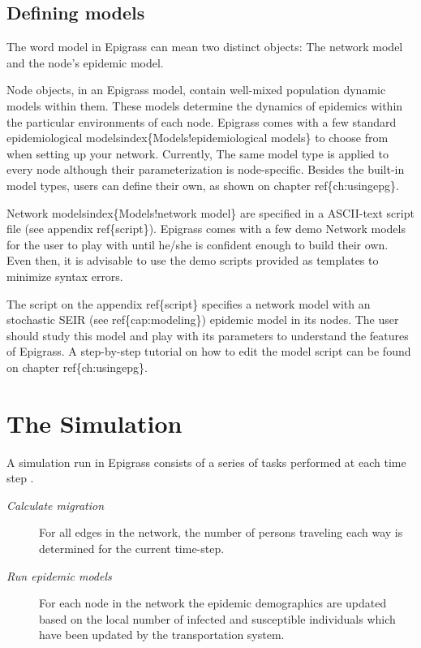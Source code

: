 \documentclass[a4paper,10pt]{manual}
\begin{document}
\subsection{Defining models}

The word model in Epigrass can mean two distinct objects: The network model and the node's epidemic model.

Node objects, in an Epigrass model, contain well-mixed population dynamic models within them. These models determine the dynamics of epidemics within the particular environments of each node. Epigrass comes with a few standard epidemiological modelsindex\{Models!epidemiological models\} to choose from when setting up your network. Currently, The same model type is applied to every node although their parameterization is node-specific. Besides the built-in model types, users can define their own, as shown on chapter ref\{ch:usingepg\}.

Network modelsindex\{Models!network model\} are specified in a ASCII-text script file (see appendix ref\{script\}). Epigrass comes with a few demo Network models for the user to play with until he/she is confident enough to build their own. Even then, it is advisable to use the demo scripts provided as templates to minimize syntax errors.

The script on the appendix ref\{script\} specifies a network model with an stochastic SEIR (see ref\{cap:modeling\}) epidemic model in its nodes. The user should study this model and play with its parameters to understand the features of Epigrass. A step-by-step tutorial on how to edit the model script can be found on chapter ref\{ch:usingepg\}.


\section{The Simulation}

A simulation run in Epigrass consists of a series of tasks performed at each time step \footnotemark[1] .
\begin{description}
\item[\emph{Calculate migration}]
For all edges in the network, the number of persons traveling each way is determined for the current time-step.

\item[\emph{Run epidemic models}]
For each node in the network the epidemic demographics are updated based on the local number of infected and susceptible individuals which have been updated by the transportation system.

\end{description}
\end{document}
